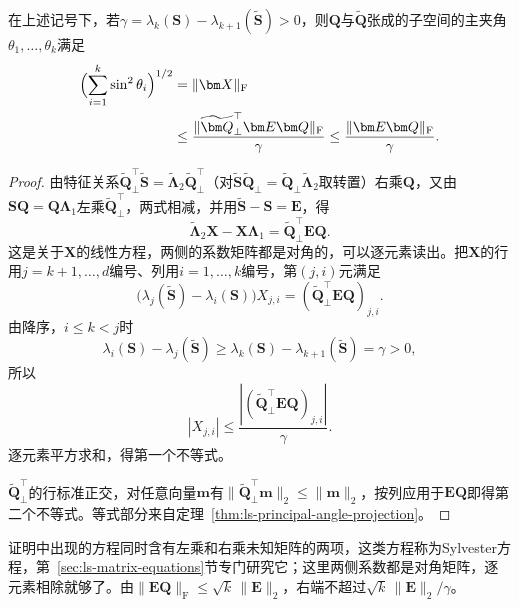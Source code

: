 \begin{theorem}[特征子空间偏转的Frobenius界]
\label{thm:ls-gap-subspace-frobenius}
在上述记号下，若$\gamma=\lambda_k(\bm S)-\lambda_{k+1}(\widetilde{\bm S})>0$，则$\bm Q$与$\widetilde{\bm Q}$张成的子空间的主夹角$\theta_1,\ldots,\theta_k$满足
\begin{equation}
 \begin{aligned}
 \Bigl(\sum_{i=1}^k\sin^2\theta_i\Bigr)^{1/2}
 &=\lVert\bm X\rVert_{\mathrm F}\\
 &\leq\frac{\lVert\widetilde{\bm Q}_\perp^\top\bm E\bm Q\rVert_{\mathrm F}}{\gamma}
 \leq\frac{\lVert\bm E\bm Q\rVert_{\mathrm F}}{\gamma}.
 \end{aligned}
 \label{eq:ls-gap-subspace-frobenius}
\end{equation}
\end{theorem}
\begin{proof}
由特征关系$\widetilde{\bm Q}_\perp^\top\widetilde{\bm S}=\widetilde{\bm\Lambda}_2\widetilde{\bm Q}_\perp^\top$（对$\widetilde{\bm S}\widetilde{\bm Q}_\perp=\widetilde{\bm Q}_\perp\widetilde{\bm\Lambda}_2$取转置）右乘$\bm Q$，又由$\bm S\bm Q=\bm Q\bm\Lambda_1$左乘$\widetilde{\bm Q}_\perp^\top$，两式相减，并用$\widetilde{\bm S}-\bm S=\bm E$，得
\[
 \widetilde{\bm\Lambda}_2\bm X-\bm X\bm\Lambda_1=\widetilde{\bm Q}_\perp^\top\bm E\bm Q .
\]
这是关于$\bm X$的线性方程，两侧的系数矩阵都是对角的，可以逐元素读出。把$\bm X$的行用$j=k+1,\ldots,d$编号、列用$i=1,\ldots,k$编号，第$(j,i)$元满足
\[
 \bigl(\lambda_j(\widetilde{\bm S})-\lambda_i(\bm S)\bigr)X_{j,i}=(\widetilde{\bm Q}_\perp^\top\bm E\bm Q)_{j,i}.
\]
由降序，$i\leq k<j$时
\[
 \lambda_i(\bm S)-\lambda_j(\widetilde{\bm S})\geq\lambda_k(\bm S)-\lambda_{k+1}(\widetilde{\bm S})=\gamma>0 ,
\]
所以
\[
 |X_{j,i}|\leq\frac{|(\widetilde{\bm Q}_\perp^\top\bm E\bm Q)_{j,i}|}{\gamma}.
\]
逐元素平方求和，得第一个不等式。

$\widetilde{\bm Q}_\perp^\top$的行标准正交，对任意向量$\bm m$有$\lVert\widetilde{\bm Q}_\perp^\top\bm m\rVert_2\leq\lVert\bm m\rVert_2$，按列应用于$\bm E\bm Q$即得第二个不等式。等式部分来自定理~\ref{thm:ls-principal-angle-projection}。
\end{proof}
证明中出现的方程同时含有左乘和右乘未知矩阵的两项，这类方程称为Sylvester方程，第~\ref{sec:ls-matrix-equations}节专门研究它；这里两侧系数都是对角矩阵，逐元素相除就够了。由$\lVert\bm E\bm Q\rVert_{\mathrm F}\leq\sqrt k\,\lVert\bm E\rVert_2$，右端不超过$\sqrt k\,\lVert\bm E\rVert_2/\gamma$。

